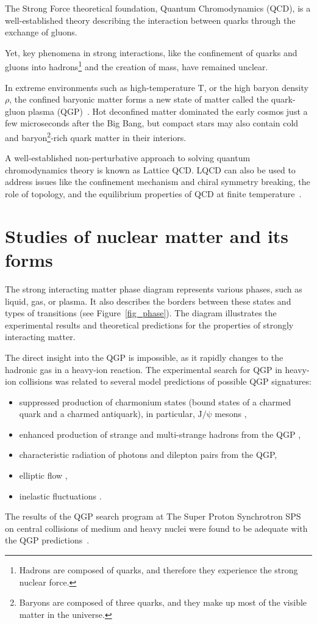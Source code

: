 \newpage

The Strong Force theoretical foundation, Quantum Chromodynamics (QCD), is a well-established theory describing the interaction between quarks through the exchange of gluons. 

Yet, key phenomena in strong interactions, like the confinement of quarks and gluons into hadrons\footnote{Hadrons are composed of quarks, and therefore they experience the strong nuclear force.} and the creation of mass, have remained unclear.

In extreme environments such as high-temperature T, or the high baryon density $\rho$, the confined baryonic matter forms a new state of matter called the quark-gluon plasma (\gls{QGP})~\cite{phase_diagram}. Hot deconfined matter dominated the early cosmos just a few microseconds after the Big Bang, but compact stars may also contain cold and baryon\footnote{Baryons are composed of three quarks, and they make up most of the visible matter in the universe.}-rich quark matter in their interiors.

A well-established non-perturbative approach to solving quantum chromodynamics theory is known as Lattice \gls{QCD}. LQCD can also be used to address issues like the confinement mechanism and chiral symmetry breaking, the role of topology, and the equilibrium properties of \gls{QCD} at finite temperature~\cite{lattice_qcd}. 

\section{Studies of nuclear matter and its forms}
 The strong interacting matter phase diagram represents various phases, such as liquid, gas, or plasma. It also describes the borders between these states and types of transitions (see Figure~\ref{fig_phase}). The diagram illustrates the experimental results and theoretical predictions for the properties of strongly interacting matter.

The direct insight into the \gls{QGP} is impossible, as it rapidly changes to the hadronic gas in a heavy-ion reaction. The experimental search for \gls{QGP} in heavy-ion collisions was related to several model predictions of possible \gls{QGP} signatures: 
\begin{itemize}
    \item suppressed production of charmonium states (bound states of a charmed quark and a charmed antiquark), in particular, $\mathrm{J/\psi}$ mesons \cite{MATSUI1986416},
    \item enhanced production of strange and multi-strange hadrons from the \gls{QGP} \cite{strageness},
    \item characteristic radiation of photons and dilepton pairs from the \gls{QGP},
    \item elliptic flow \cite{Stefaniak:2022dxo},
    \item inelastic fluctuations \cite{Stefaniak:2022dxo}.
\end{itemize}
The results of the QGP search program at The Super Proton Synchrotron \gls{SPS} on central collisions of medium and heavy nuclei were found to be adequate with the QGP predictions~\cite{Rafelski_2015}.

